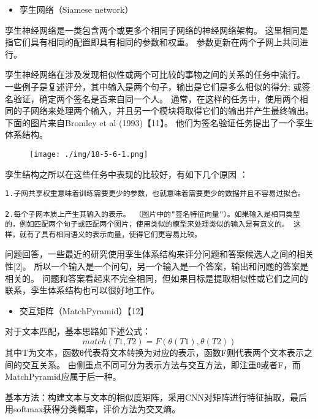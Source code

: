 \begin{itemize}
\item
  孪生网络（Siamese network）
\end{itemize}

孪生神经网络是一类包含两个或更多个相同子网络的神经网络架构。
这里相同是指它们具有相同的配置即具有相同的参数和权重。
参数更新在两个子网上共同进行。

孪生神经网络在涉及发现相似性或两个可比较的事物之间的关系的任务中流行。
一些例子是复述评分，其中输入是两个句子，输出是它们是多么相似的得分;
或签名验证，确定两个签名是否来自同一个人。
通常，在这样的任务中，使用两个相同的子网络来处理两个输入，并且另一个模块将取得它们的输出并产生最终输出。
下面的图片来自Bromley et al (1993)【11】。
他们为签名验证任务提出了一个孪生体系结构。

\begin{figure}
\centering
\texttt{[image: ./img/18-5-6-1.png]}
\caption{}
\end{figure}

孪生结构之所以在这些任务中表现的比较好，有如下几个原因 ：

\begin{verbatim}
1.子网共享权重意味着训练需要更少的参数，也就意味着需要更少的数据并且不容易过拟合。

2.每个子网本质上产生其输入的表示。 （图片中的"签名特征向量"）。如果输入是相同类型的，例如匹配两个句子或匹配两个图片，使用类似的模型来处理类似的输入是有意义的。 这样，就有了具有相同语义的表示向量，使得它们更容易比较。
\end{verbatim}

问题回答，一些最近的研究使用孪生体系结构来评分问题和答案候选人之间的相关性{[}2{]}。
所以一个输入是一个问句，另一个输入是一个答案，输出和问题的答案是相关的。
问题和答案看起来不完全相同，但如果目标是提取相似性或它们之间的联系，孪生体系结构也可以很好地工作。

\begin{itemize}
\item
  交互矩阵（MatchPyramid）【12】
\end{itemize}

对于文本匹配，基本思路如下述公式： \[
match(T1,T2)=F(θ(T1),θ(T2))
\]
其中T为文本，函数θ代表将文本转换为对应的表示，函数F则代表两个文本表示之间的交互关系。
由侧重点不同可分为表示方法与交互方法，即注重θ或者F，而MatchPyramid应属于后一种。

基本方法：构建文本与文本的相似度矩阵，采用CNN对矩阵进行特征抽取，最后用softmax获得分类概率，评价方法为交叉熵。

